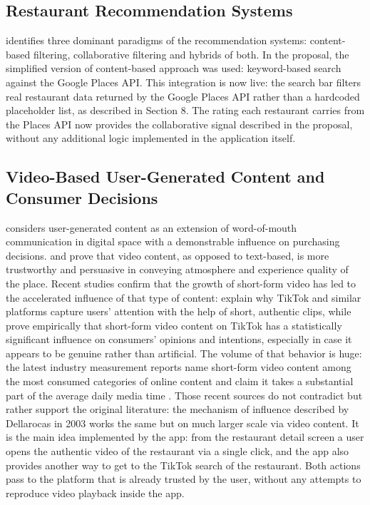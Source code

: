 \documentclass[12pt, a4paper]{article}
\begin{document}
\subsection{Restaurant Recommendation Systems}

\citet{adomavicius2005} identifies three dominant paradigms of the recommendation systems: content-based filtering, collaborative filtering and hybrids of both. In the proposal, the simplified version of content-based approach was used: keyword-based search against the Google Places API. This integration is now live: the search bar filters real restaurant data returned by the Google Places API rather than a hardcoded placeholder list, as described in Section 8. The rating each restaurant carries from the Places API now provides the collaborative signal described in the proposal, without any additional logic implemented in the application itself.

\subsection{Video-Based User-Generated Content and Consumer Decisions}

\citet{dellarocas2003} considers user-generated content as an extension of word-of-mouth communication in digital space with a demonstrable influence on purchasing decisions. \citet{kaplan2010} and \citet{cheung2009} prove that video content, as opposed to text-based, is more trustworthy and persuasive in conveying atmosphere and experience quality of the place. Recent studies confirm that the growth of short-form video has led to the accelerated influence of that type of content: \citet{montag2021} explain why TikTok and similar platforms capture users' attention with the help of short, authentic clips, while \citet{barta2023} prove empirically that short-form video content on TikTok has a statistically significant influence on consumers' opinions and intentions, especially in case it appears to be genuine rather than artificial. The volume of that behavior is huge: the latest industry measurement reports name short-form video content among the most consumed categories of online content and claim it takes a substantial part of the average daily media time \citep{datareportal2024}. Those recent sources do not contradict but rather support the original literature: the mechanism of influence described by Dellarocas in 2003 works the same but on much larger scale via video content. It is the main idea implemented by the app: from the restaurant detail screen a user opens the authentic video of the restaurant via a single click, and the app also provides another way to get to the TikTok search of the restaurant. Both actions pass to the platform that is already trusted by the user, without any attempts to reproduce video playback inside the app.
\end{document}
